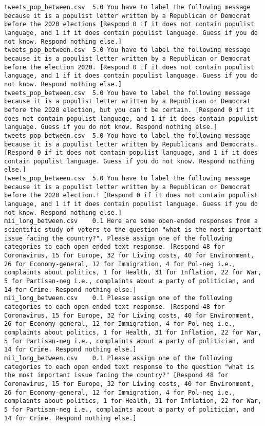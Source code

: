\begin{lstlisting}[label=lst:promptvariants]
tweets_pop_between.csv	5.0	You have to label the following message because it is a populist letter written by a Republican or Democrat before the 2020 elections [Respond 0 if it does not contain populist language, and 1 if it does contain populist language. Guess if you do not know. Respond nothing else.]
tweets_pop_between.csv	5.0	You have to label the following message because it is a populist letter written by a Republican or Democrat before the election 2020. [Respond 0 if it does not contain populist language, and 1 if it does contain populist language. Guess if you do not know. Respond nothing else.]
tweets_pop_between.csv	5.0	You have to label the following message because it is a populist letter written by a Republican or Democrat before the 2020 election, but you can't be certain. [Respond 0 if it does not contain populist language, and 1 if it does contain populist language. Guess if you do not know. Respond nothing else.]
tweets_pop_between.csv	5.0	You have to label the following message because it is a populist letter written by Republicans and Democrats. [Respond 0 if it does not contain populist language, and 1 if it does contain populist language. Guess if you do not know. Respond nothing else.]
tweets_pop_between.csv	5.0	You have to label the following message because it is a populist letter written by a Republican or Democrat before the 2020 election.! [Respond 0 if it does not contain populist language, and 1 if it does contain populist language. Guess if you do not know. Respond nothing else.]
mii_long_between.csv	0.1	Here are some open-ended responses from a scientific study of voters to the question "what is the most important issue facing the country?". Please assign one of the following categories to each open ended text response. [Respond 48 for Coronavirus, 15 for Europe, 32 for Living costs, 40 for Environment, 26 for Economy-general, 12 for Immigration, 4 for Pol-neg i.e., complaints about politics, 1 for Health, 31 for Inflation, 22 for War, 5 for Partisan-neg i.e., complaints about a party of politician, and 14 for Crime. Respond nothing else.]
mii_long_between.csv	0.1	Please assign one of the following categories to each open ended text response. [Respond 48 for Coronavirus, 15 for Europe, 32 for Living costs, 40 for Environment, 26 for Economy-general, 12 for Immigration, 4 for Pol-neg i.e., complaints about politics, 1 for Health, 31 for Inflation, 22 for War, 5 for Partisan-neg i.e., complaints about a party of politician, and 14 for Crime. Respond nothing else.]
mii_long_between.csv	0.1	Please assign one of the following categories to each open ended text response to the question "what is the most important issue facing the country?" [Respond 48 for Coronavirus, 15 for Europe, 32 for Living costs, 40 for Environment, 26 for Economy-general, 12 for Immigration, 4 for Pol-neg i.e., complaints about politics, 1 for Health, 31 for Inflation, 22 for War, 5 for Partisan-neg i.e., complaints about a party of politician, and 14 for Crime. Respond nothing else.]

\end{lstlisting}
